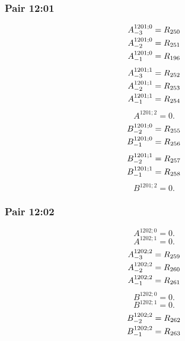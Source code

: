 \documentclass[11pt,a4paper]{article}
\begin{document}
\subsubsection{Pair 12:01}
\begin{equation}
\shortstack[l]{$\displaystyle A^{1201;0}_{-3}=R_{250}$\\
$\displaystyle A^{1201;0}_{-2}=R_{251}$\\
$\displaystyle A^{1201;0}_{-1}=R_{196}$}
\label{eq:cat-map-276}
\end{equation}
\begin{equation}
\shortstack[l]{$\displaystyle A^{1201;1}_{-3}=R_{252}$\\
$\displaystyle A^{1201;1}_{-2}=R_{253}$\\
$\displaystyle A^{1201;1}_{-1}=R_{254}$}
\label{eq:cat-map-277}
\end{equation}
\begin{equation}
A^{1201;2}=0.
\label{eq:cat-map-278}
\end{equation}
\begin{equation}
\shortstack[l]{$\displaystyle B^{1201;0}_{-2}=R_{255}$\\
$\displaystyle B^{1201;0}_{-1}=R_{256}$}
\label{eq:cat-map-279}
\end{equation}
\begin{equation}
\shortstack[l]{$\displaystyle B^{1201;1}_{-2}=R_{257}$\\
$\displaystyle B^{1201;1}_{-1}=R_{258}$}
\label{eq:cat-map-280}
\end{equation}
\begin{equation}
B^{1201;2}=0.
\label{eq:cat-map-281}
\end{equation}
\subsubsection{Pair 12:02}
\begin{equation}
A^{1202;0}=0.
\label{eq:cat-map-282}
\end{equation}
\begin{equation}
A^{1202;1}=0.
\label{eq:cat-map-283}
\end{equation}
\begin{equation}
\shortstack[l]{$\displaystyle A^{1202;2}_{-3}=R_{259}$\\
$\displaystyle A^{1202;2}_{-2}=R_{260}$\\
$\displaystyle A^{1202;2}_{-1}=R_{261}$}
\label{eq:cat-map-284}
\end{equation}
\begin{equation}
B^{1202;0}=0.
\label{eq:cat-map-285}
\end{equation}
\begin{equation}
B^{1202;1}=0.
\label{eq:cat-map-286}
\end{equation}
\begin{equation}
\shortstack[l]{$\displaystyle B^{1202;2}_{-2}=R_{262}$\\
$\displaystyle B^{1202;2}_{-1}=R_{263}$}
\label{eq:cat-map-287}
\end{equation}
\end{document}
